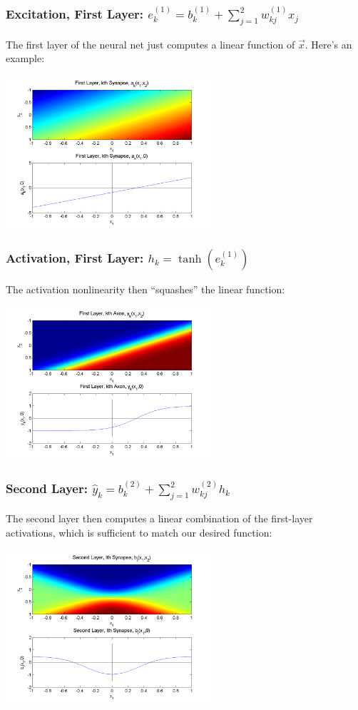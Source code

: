 \documentclass{beamer}
\begin{document}
\begin{frame}
  \frametitle{Excitation, First Layer:
    $e_k^{(1)}=b_{k}^{(1)}+\sum_{j=1}^2 w_{kj}^{(1)}x_j$} The first
  layer of the neural net just computes a linear function of
  $\vec{x}$. Here's an example:
  \centerline{\includegraphics[width=3in]{figs/nn_synapse1.png}}
\end{frame}

\begin{frame}
  \frametitle{Activation, First Layer: $h_k=\tanh(e_k^{(1)})$} The
  activation nonlinearity then ``squashes'' the linear function:
  \centerline{\includegraphics[width=3in]{figs/nn_axon1.png}}
\end{frame}

\begin{frame}
  \frametitle{Second Layer:
    $\hat{y}_k=b_{k}^{(2)}+\sum_{j=1}^2w_{kj}^{(2)}h_k$} The second
  layer then computes a linear combination of the first-layer
  activations, which is sufficient to match our desired function:
  \centerline{\includegraphics[width=3in]{figs/nn_synapse2.png}}
\end{frame}
%
\end{document}
